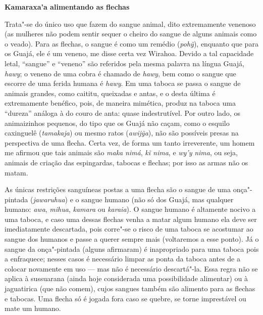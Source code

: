 \textbf{Kamaraxa'a alimentando as flechas}

Trata"-se do único uso que fazem do sangue animal, dito extremamente
venenoso (as mulheres não podem sentir sequer o cheiro do sangue de
alguns animais como o veado). Para as flechas, o sangue é como um
remédio (\emph{pohỹ}), enquanto que para os Guajá, ele é um veneno, me
disse certa vez Wirahoa. Devido a tal capacidade letal, ``sangue'' e
``veneno'' são referidos pela mesma palavra na língua Guajá, \emph{hawy};
o veneno de uma cobra é chamado de \emph{hawy}, bem como o sangue que
escorre de uma ferida humana é \emph{hawy}. Em uma taboca se passa o
sangue de animais grandes, como caititu, queixadas e antas, e o desta
última é extremamente benéfico, pois, de maneira mimética, produz na
taboca uma ``dureza'' análoga à do couro de anta: quase indestrutível. Por
outro lado, os animaizinhos pequenos, do tipo que os Guajá não caçam,
como o esquilo caxinguelê (\emph{tamakaja}) ou mesmo ratos
(\emph{awijỹa}), não são possíveis presas na perspectiva de uma flecha.
Certa vez, de forma um tanto irreverente, um homem me afirmou que tais
animais são \emph{maka} \emph{nimá}, \emph{kĩ nima}, e \emph{wy'y}
\emph{nima}, ou seja, animais de criação das espingardas, tabocas e
flechas; por isso as armas não os matam.

As únicas restrições sanguíneas postas a uma flecha são o sangue de uma
onça"-pintada (\emph{jawaruhua}) e o sangue humano (não só dos Guajá, mas
qualquer humano: \emph{awa}, \emph{mihua}, \emph{kamara} ou
\emph{karaia}). O sangue humano é altamente nocivo a uma taboca, e caso
uma dessas flechas venha a matar algum humano ela deve ser imediatamente
descartada, pois corre"-se o risco de uma taboca se acostumar ao sangue
dos humanos e passe a querer sempre mais (voltaremos a esse ponto). Já o
sangue da onça"-pintada (alguns afirmaram) é inapropriado para uma taboca
pois a enfraquece; nesses casos é necessário limpar as ponta da taboca
antes de a colocar novamente em uso --- mas não é necessário descartá"-la.
Essa regra não se aplica à sussuarana (ainda hoje considerada uma
possibilidade alimentar) ou à jaguatirica (que não comem), cujos sangues
também são alimento para as flechas e tabocas. Uma flecha só é jogada
fora caso se quebre, se torne imprestável ou mate um humano.

